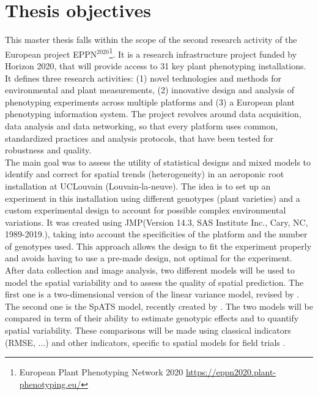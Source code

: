 \section{Thesis objectives}
This master thesis falls within the scope of the second research activity of the European project EPPN$^{2020}$\footnote{European Plant Phenotyping Network 2020 \url{https://eppn2020.plant-phenotyping.eu/}}. It is a research infrastructure project funded by  Horizon 2020, that will provide access to 31 key plant phenotyping installations. It defines three research activities: (1) novel technologies and methods for environmental and plant measurements, (2) innovative design and analysis of phenotyping experiments across multiple
platforms and (3) a European plant phenotyping information system. The project revolves around data acquisition, data analysis and data networking, so that every platform uses common, standardized practices and analysis protocols, that have been tested for robustness and quality.\\

The main goal was to assess the utility of statistical designs and mixed models to identify and correct for spatial trends (heterogeneity) in an aeroponic root installation at UCLouvain (Louvain-la-neuve). The idea is to set up an experiment in this installation using different genotypes (plant varieties) and a custom experimental design to account for possible complex environmental variations. It was created using JMP\textregistered (Version 14.3, SAS Institute Inc., Cary, NC, 1989-2019.), taking into account the specificities of the platform and the number of genotypes used. This approach allows the design to fit the experiment properly and avoids having to use a pre-made design, not optimal for the experiment.
After data collection and image analysis, two different models will be used to model the spatial variability and to assess the quality of spatial prediction. The first one is a two-dimensional version of the linear variance model, revised by \textcite{piepho_linear_2010}. The second one is the SpATS model, recently created by \textcite{rodriguez-alvarez_correcting_2018}. 
The two models will be compared in term of their ability to estimate genotypic effects and to quantify spatial variability. These comparisons will be made using classical indicators (RMSE, $\ldots$) and other indicators, specific to spatial models for field trials \parencite{oakey_joint_2006}.\\

